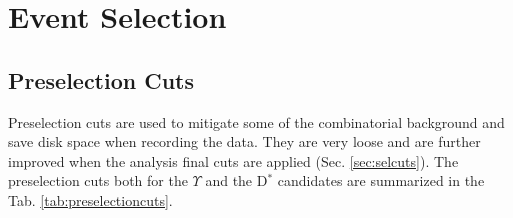 \section{Event Selection}\label{sec:evtsel}

\subsection{Preselection Cuts} \label{subsec:preselcuts}

Preselection cuts are used to mitigate some of the combinatorial background and save disk space when recording the data. They are very loose and are further improved when the analysis final cuts are applied (Sec. \ref{sec:selcuts}). The preselection cuts both for the $\Upsilon$ and the D$^*$ candidates are summarized in the Tab. \ref{tab:preselectioncuts}.

